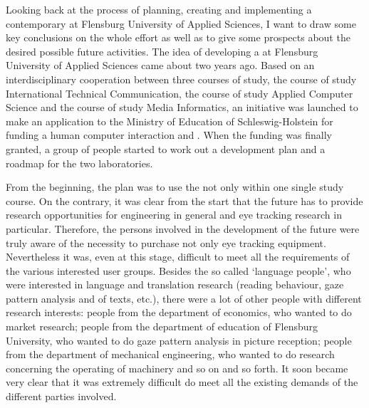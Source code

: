\documentclass[output=paper]{langsci/langscibook}
\begin{document}
Looking back at the process of planning, creating and implementing a contemporary  at Flensburg University of Applied Sciences, I want to draw some key conclusions on the whole effort as well as to give some prospects about the desired possible future activities. The idea of developing a  at Flensburg University of Applied Sciences came about two years ago. Based on an interdisciplinary cooperation between three courses of study, the course of study International Technical Communication, the course of study Applied Computer Science and the course of study Media Informatics, an initiative was launched to make an application to the Ministry of Education of Schleswig-Holstein for funding a human computer interaction and . When the funding was finally granted, a group of people started to work out a development plan and a roadmap for the two laboratories.



\newpage 
From the beginning, the plan was to use the  not only within one single study course. On the contrary, it was clear from the start that the future  has to provide research opportunities for  engineering in general and eye tracking research in particular. Therefore, the persons involved in the development of the future  were truly aware of the necessity to purchase not only eye tracking equipment. Nevertheless it was, even at this stage, difficult to meet all the requirements of the various interested user groups. Besides the so called `language people', who were interested in language and translation research (reading behaviour, gaze pattern analysis and  of texts, etc.), there were a lot of other people with different research interests: people from the department of economics, who wanted to do market research; people from the department of education of Flensburg University, who wanted to do gaze pattern analysis in picture reception; people from the department of mechanical engineering, who wanted to do research concerning the operating of machinery and so on and so forth. It soon became very clear that it was extremely difficult do meet all the existing demands of the different parties involved.
\end{document}
